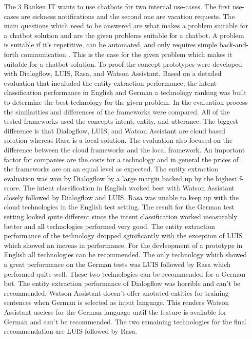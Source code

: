 The 3 Banken IT wants to use chatbots for two internal use-cases.
The first use-cases are sickness notifications and the second one 
are vacation requests.
The main questions which need to be answered are 
what makes a problem suitable for a chatbot solution and are the given 
problems suitable for a chatbot.
A problem is suitable if it's repetitive, can be automated, and 
only requires simple back-and-forth communication \citet{buiildChatbotsPython}.
This is the case for the given problem which makes it suitable for a
chatbot solution.
To proof the concept prototypes were developed with Dialogflow, LUIS, Rasa, 
and Watson Assistant.
Based on a detailed evaluation that inculuded the entity extraction performance, 
the intent classification performance in English and German a technology ranking 
was built to determine the best technology for the given problem.
In the evaluation process the similarities and differences of the 
frameworks were compared.
All of the tested frameworks used the concepts intent, entity, and utterance.
The biggest difference is that Dialogflow, LUIS, and Watson Assistant are 
cloud based solution whereas Rasa is a local solution.
The evaluation also focused on the difference between the cloud frameworks and the 
local framework.
An important factor for companies are the costs for a technology and in general the 
prices of the frameworks are on an equal level as expected.
The entity extraction evaluation was won by Dialogflow by a large margin backed up 
by the highest f-score.
The intent classification in English worked best with Watson Assistant closely followed 
by Dialogflow and LUIS.
Rasa was unable to keep up with the cloud technologies in the English test setting.
The result for the German test setting looked quite different since the 
intent classification worked measurably better and all technologies 
performed very good.
The entity extraction performance of the technology dropped sginificantly with the 
exception of LUIS which showed an increas in performance.
For the devleopment of a prototype in English all technologies can be recommended.
The only technology which showed a great performance on the 
German tests was LUIS followed by Rasa which performed quite well.
These two technologies can be recommended for a German bot.
The entity extraction performance of Dialogflow was horrible and can't be
recommended.
Watson Assistant doesn't offer anotated entities for training sentences when German 
is selected as input language.
This renders Watson Assistant useless for the German language until the feature is 
available for German and can't be recommended.
The two remaining technologies for the final recommendation are LUIS followed by Rasa.  

